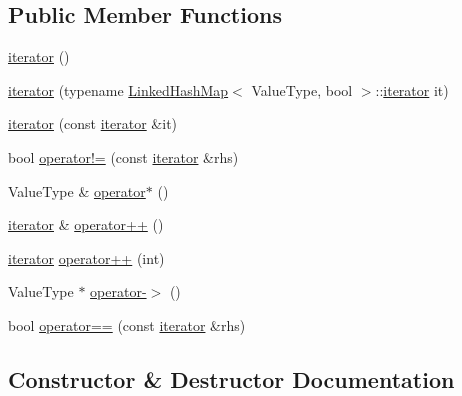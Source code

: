 \subsection*{Public Member Functions}
\begin{DoxyCompactItemize}
\item 
\mbox{\hyperlink{classLinkedHashSet_1_1iterator_a67d652c2433cf9217ed2a1485092fdd1}{iterator}} ()
\item 
\mbox{\hyperlink{classLinkedHashSet_1_1iterator_a44e7c6c3dc4ffdb458b6218d7d776207}{iterator}} (typename \mbox{\hyperlink{classLinkedHashMap}{Linked\+Hash\+Map}}$<$ Value\+Type, bool $>$\+::\mbox{\hyperlink{classLinkedHashSet_1_1iterator}{iterator}} it)
\item 
\mbox{\hyperlink{classLinkedHashSet_1_1iterator_a698b7553261e7209d6c29fb55627dce4}{iterator}} (const \mbox{\hyperlink{classLinkedHashSet_1_1iterator}{iterator}} \&it)
\item 
bool \mbox{\hyperlink{classLinkedHashSet_1_1iterator_ae1983f2cb0df1f0cbe77ac29590e2e2b}{operator!=}} (const \mbox{\hyperlink{classLinkedHashSet_1_1iterator}{iterator}} \&rhs)
\item 
Value\+Type \& \mbox{\hyperlink{classLinkedHashSet_1_1iterator_ae7b3826e734ec2f7c79f5196fad83989}{operator$\ast$}} ()
\item 
\mbox{\hyperlink{classLinkedHashSet_1_1iterator}{iterator}} \& \mbox{\hyperlink{classLinkedHashSet_1_1iterator_af1b1c7856a59f34c7d3570f946a2ff00}{operator++}} ()
\item 
\mbox{\hyperlink{classLinkedHashSet_1_1iterator}{iterator}} \mbox{\hyperlink{classLinkedHashSet_1_1iterator_a538d230f8b52d2bc0950e26ce74ec239}{operator++}} (int)
\item 
Value\+Type $\ast$ \mbox{\hyperlink{classLinkedHashSet_1_1iterator_a5ba42337ec7bae549bb135838933b0ea}{operator-\/$>$}} ()
\item 
bool \mbox{\hyperlink{classLinkedHashSet_1_1iterator_a798956e7a65ef16c891d129b3ced0f9e}{operator==}} (const \mbox{\hyperlink{classLinkedHashSet_1_1iterator}{iterator}} \&rhs)
\end{DoxyCompactItemize}


\subsection{Constructor \& Destructor Documentation}
\mbox{\label{classLinkedHashSet_1_1iterator_a67d652c2433cf9217ed2a1485092fdd1}} 
